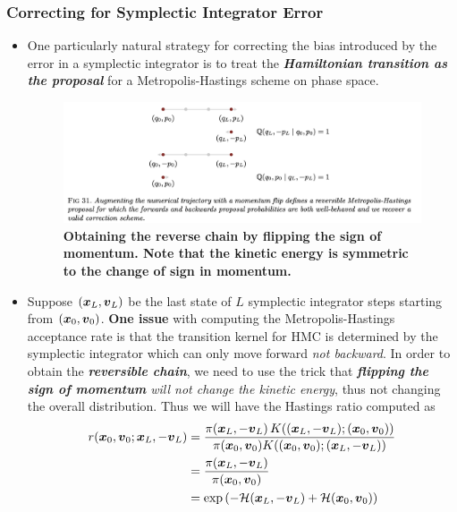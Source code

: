 \documentclass[11pt]{article}
\begin{document}
\subsubsection{Correcting for Symplectic Integrator Error}
\begin{itemize}
\item One particularly natural strategy for correcting the bias introduced by the error in a symplectic integrator is to treat the \emph{\textbf{Hamiltonian transition as the proposal}} for a Metropolis-Hastings scheme on phase space. 

\begin{figure}
\begin{minipage}[t]{1\linewidth}
  \centering
  \centerline{\includegraphics[scale = 0.6]{metro_hmc.png}}
\end{minipage}
\caption{\footnotesize{\textbf{Obtaining the reverse chain by flipping the sign of momentum. Note that the kinetic energy is symmetric to the change of sign in momentum. \citep{betancourt2017conceptual}}}}
\label{fig: metro_hmc}
\end{figure}

\item Suppose $(\boldsymbol{x}_{L}, \boldsymbol{v}_{L})$ be the last state of $L$ symplectic integrator steps starting from $(\boldsymbol{x}_{0}, \boldsymbol{v}_{0})$. \textbf{One issue} with computing the Metropolis-Hastings acceptance rate is that the transition kernel for HMC is determined by the symplectic integrator which can only move forward \emph{not backward}. In order to obtain the \emph{\textbf{reversible chain}}, we need to use the trick that \emph{\textbf{flipping the sign of momentum} will not change the kinetic energy}, thus not changing the overall distribution. Thus we will have the Hastings ratio computed as
\begin{align}
r(\boldsymbol{x}_{0}, \boldsymbol{v}_{0}; \boldsymbol{x}_{L}, -\boldsymbol{v}_{L}) &=\frac{\pi(\boldsymbol{x}_{L}, -\boldsymbol{v}_{L})\,K((\boldsymbol{x}_{L}, -\boldsymbol{v}_{L}); (\boldsymbol{x}_{0}, \boldsymbol{v}_{0}))}{\pi(\boldsymbol{x}_{0}, \boldsymbol{v}_{0})K((\boldsymbol{x}_{0}, \boldsymbol{v}_{0}); (\boldsymbol{x}_{L}, -\boldsymbol{v}_{L}))}  \nonumber\\
&=  \frac{\pi(\boldsymbol{x}_{L}, -\boldsymbol{v}_{L})}{\pi(\boldsymbol{x}_{0}, \boldsymbol{v}_{0})} \nonumber\\
&= \exp\left(-{\mathcal H}(\boldsymbol{x}_{L}, -\boldsymbol{v}_{L}) + {\mathcal H}(\boldsymbol{x}_{0}, \boldsymbol{v}_{0})\right)\label{eqn: hmc_hastings_ratio}
\end{align}


\end{itemize}
\end{document}
